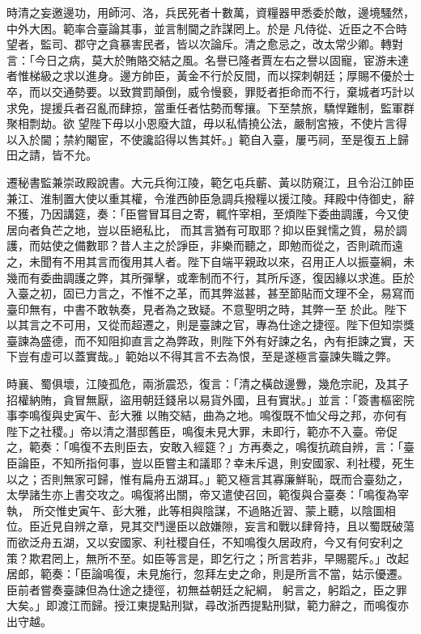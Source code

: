 \begin{pinyinscope}
 時清之妄邀邊功，用師河、洛，兵民死者十數萬，資糧器甲悉委於敵，邊境騷然，中外大困。範率合臺論其事，並言制閫之詐謀罔上。於是
 凡侍從、近臣之不合時望者，監司、郡守之貪暴害民者，皆以次論斥。清之愈忌之，改太常少卿。轉對言：「今日之病，莫大於賄賂交結之風。名譽已隆者賈左右之譽以固寵，宦游未達者惟梯級之求以進身。邊方帥臣，黃金不行於反間，而以探刺朝廷；厚賜不優於士卒，而以交通勢要。以致賞罰顛倒，威令慢褻，罪貶者拒命而不行，棄城者巧計以求免，提援兵者召亂而肆掠，當重任者怙勢而奪攘。下至禁旅，驕悍難制，監軍群聚相剽劫。欲
 望陛下毋以小恩廢大誼，毋以私情撓公法，嚴制宮掖，不使片言得以入於閫；禁約閹宦，不使讒諂得以售其奸。」範自入臺，屢丐祠，至是復五上歸田之請，皆不允。



 遷秘書監兼崇政殿說書。大元兵徇江陵，範乞屯兵蘄、黃以防窺江，且令沿江帥臣兼江、淮制置大使以重其權，令淮西帥臣急調兵撥糧以援江陵。拜殿中侍御史，辭不獲，乃因講筵，奏：「臣嘗冒耳目之寄，輒忤宰相，至煩陛下委曲調護，今又使居向者負芒之地，豈以臣絕私比，
 而其言猶有可取耶？抑以臣巽懦之質，易於調護，而姑使之備數耶？昔人主之於諍臣，非樂而聽之，即勉而從之，否則疏而遠之，未聞有不用其言而復用其人者。陛下自端平親政以來，召用正人以振臺綱，未幾而有委曲調護之弊，其所彈擊，或牽制而不行，其所斥逐，復因緣以求進。臣於入臺之初，固已力言之，不惟不之革，而其弊滋甚，甚至節貼而文理不全，易寫而臺印無有，中書不敢執奏，見者為之致疑。不意聖明之時，其弊一至
 於此。陛下以其言之不可用，又從而超遷之，則是臺諫之官，專為仕途之捷徑。陛下但知崇獎臺諫為盛德，而不知阻抑直言之為弊政，則陛下外有好諫之名，內有拒諫之實，天下豈有虛可以蓋實哉。」範始以不得其言不去為恨，至是遂極言臺諫失職之弊。



 時襄、蜀俱壞，江陵孤危，兩浙震恐，復言：「清之橫啟邊釁，幾危宗祀，及其子招權納賄，貪冒無厭，盜用朝廷錢帛以易貨外國，且有實狀。」並言：「簽書樞密院事李鳴復與史寅午、彭大雅
 以賄交結，曲為之地。鳴復既不恤父母之邦，亦何有陛下之社稷。」帝以清之潛邸舊臣，鳴復未見大罪，未即行，範亦不入臺。帝促之，範奏：「鳴復不去則臣去，安敢入經筵？」方再奏之，鳴復抗疏自辨，言：「臺臣論臣，不知所指何事，豈以臣嘗主和議耶？幸未斥退，則安國家、利社稷，死生以之；否則無家可歸，惟有扁舟五湖耳。」範又極言其寡廉鮮恥，既而合臺劾之，太學諸生亦上書交攻之。鳴復將出關，帝又遣使召回，範復與合臺奏：「鳴復為宰執，
 所交惟史寅午、彭大雅，此等相與陰謀，不過賂近習、蒙上聽，以陰圖相位。臣近見自辨之章，見其交鬥邊臣以啟嫌隙，妄言和戰以肆脅持，且以蜀既破蕩而欲泛舟五湖，又以安國家、利社稷自任，不知鳴復久居政府，今又有何安利之策？欺君罔上，無所不至。如臣等言是，即乞行之；所言若非，早賜罷斥。」改起居郎，範奏：「臣論鳴復，未見施行，忽拜左史之命，則是所言不當，姑示優遷。臣前者嘗奏臺諫但為仕途之捷徑，初無益朝廷之紀綱，
 躬言之，躬蹈之，臣之罪大矣。」即渡江而歸。授江東提點刑獄，尋改浙西提點刑獄，範力辭之，而鳴復亦出守越。




\end{pinyinscope}
